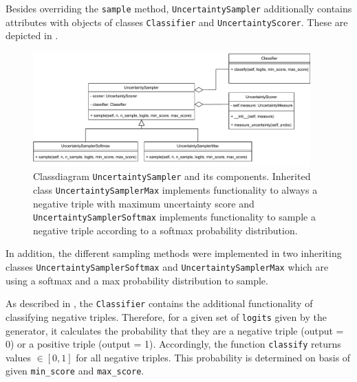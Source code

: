 Besides overriding the \texttt{sample} method, \texttt{UncertaintySampler} additionally contains attributes with objects of classes \texttt{Classifier} and \texttt{UncertaintyScorer}.
These are depicted in .
\begin{figure}[t]
  \centering
    \includegraphics[width=0.95\textwidth]{figures/classdiagrams/UncertaintySampler.pdf}
    \caption{Classdiagram \texttt{UncertaintySampler} and its components.
    Inherited class \texttt{UncertaintySamplerMax} implements functionality to always a negative triple with maximum uncertainty score and \texttt{UncertaintySamplerSoftmax} implements functionality to sample a negative triple according to a softmax probability distribution.}
  \label{fig:uncertainty_sampler}
\end{figure}
In addition, the different sampling methods were implemented in two inheriting classes \texttt{UncertaintySamplerSoftmax} and \texttt{UncertaintySamplerMax} which are using a softmax and a max probability distribution to sample.

As described in , the \texttt{Classifier} contains the additional functionality of classifying negative triples.
Therefore, for a given set of \texttt{logits} given by the generator, it calculates the probability that they are a negative triple (output = 0) or a positive triple (output = 1).
Accordingly, the function \texttt{classify} returns values $\in [0,1]$ for all negative triples.
This probability is determined on basis of given \texttt{min\_score} and \texttt{max\_score}.

